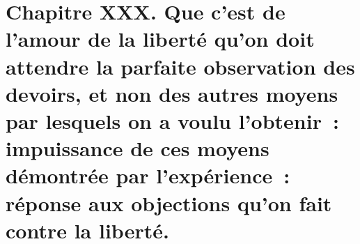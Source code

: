 \documentclass[french,twoside]{book} %
\newcommand\chapteropen{} %
\begin{document}
\chapteropen
\chapter[{Chapitre XXX. Que c’est de l’amour de la liberté qu’on doit attendre la parfaite observation des devoirs, et non des autres moyens par lesquels on a voulu l’obtenir : impuissance de ces moyens démontrée par l’expérience : réponse aux objections qu’on fait contre la liberté.}]{Chapitre XXX. Que c’est de l’amour de la liberté qu’on doit attendre la parfaite observation des devoirs, et non des autres moyens par lesquels on a voulu l’obtenir : impuissance de ces moyens démontrée par l’expérience : réponse aux objections qu’on fait contre la liberté.}\renewcommand{\leftmark}{Chapitre XXX. Que c’est de l’amour de la liberté qu’on doit attendre la parfaite observation des devoirs, et non des autres moyens par lesquels on a voulu l’obtenir : impuissance de ces moyens démontrée par l’expérience : réponse aux objections qu’on fait contre la liberté.}
\end{document}
